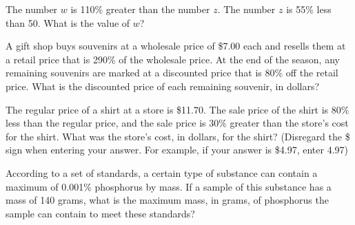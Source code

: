 The number $w$ is 110\% greater than the number $z$.  
The number $z$ is 55\% less than 50.  
What is the value of $w$?

\vspace{0.75em}


\vspace{2em}

\newpage
\noindent\markforreview
\vspace{1em}

A gift shop buys souvenirs at a wholesale price of \$7.00 each and resells them at a retail price that is 290\% of the wholesale price.  
At the end of the season, any remaining souvenirs are marked at a discounted price that is 80\% off the retail price.  
What is the discounted price of each remaining souvenir, in dollars?

\vspace{0.75em}



\vspace{2em}

\noindent\markforreview
\vspace{1em}

The regular price of a shirt at a store is \$11.70.  
The sale price of the shirt is 80\% less than the regular price, and the sale price is 30\% greater than the store’s cost for the shirt.  
What was the store’s cost, in dollars, for the shirt?  
(Disregard the \$ sign when entering your answer. For example, if your answer is \$4.97, enter 4.97)

\vspace{0.75em}



\vspace{2em}

\noindent\markforreview
\vspace{1em}

According to a set of standards, a certain type of substance can contain a maximum of 0.001\% phosphorus by mass.  
If a sample of this substance has a mass of 140 grams, what is the maximum mass, in grams, of phosphorus the sample can contain to meet these standards?

\vspace{0.75em}



\vspace{2em}

\noindent\markforreview
\vspace{1em}

